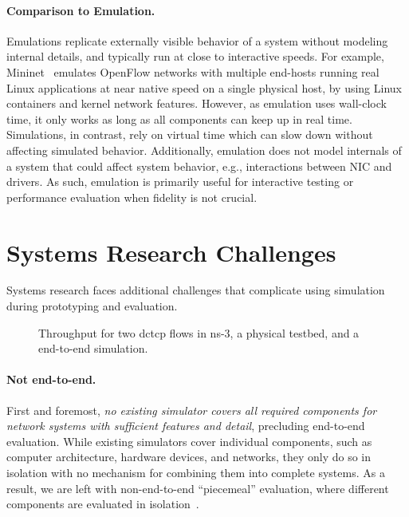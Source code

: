 \paragraph{Comparison to Emulation.}
Emulations replicate externally visible behavior of a system without
modeling internal details, and typically run at close to interactive
speeds.
%
For example, Mininet~\cite{lantz:mininet} emulates OpenFlow networks with
multiple end-hosts running real Linux applications at near native speed on a
single physical host, by using Linux containers and kernel network features.
%
However, as emulation uses wall-clock time, it only works as long as
all components can keep up in real time.
%
Simulations, in contrast, rely on virtual time which can slow down without
affecting simulated behavior.
%
Additionally, emulation does not model internals of a system that could affect
system behavior, e.g., interactions between NIC and drivers.
%
As such, emulation is primarily useful for interactive testing or performance
evaluation when fidelity is not crucial.




\section{Systems Research Challenges}
\label{ssec:bg:sysresearch}
%
Systems research faces additional challenges that complicate using
simulation during prototyping and evaluation.

\begin{figure}%
\centering%
%
\caption{Throughput for two dctcp flows in ns-3, a physical
      testbed, and a \sysname end-to-end simulation.}%
\label{fig:dctcp}%
\end{figure}

\paragraph{Not end-to-end.}
First and foremost, \emph{no existing simulator covers all
required components for network systems with sufficient features and
detail}, precluding end-to-end evaluation.
%
While existing simulators cover individual components, such as computer
architecture, hardware devices, and networks, they only do so in isolation with
no mechanism for combining them into complete systems.
%
As a result, we are left with non-end-to-end ``piecemeal'' evaluation,
where different components are evaluated in isolation~\cite{
  arashloo:tonic,mittal:irn,handley:ndp}.

